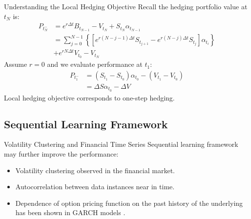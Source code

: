 \documentclass[10pt,table,mathserif]{beamer}
\begin{document}
\begin{frame}{Understanding the Local Hedging Objective}
Recall the hedging portfolio value at $t_N$ is:
\[ \begin{split}
P_{t_N^-}&=e^{r \Delta t} B_{t_{N-1}}- V_{t_N}+ S_{t_N} \alpha_{t_{N-1}}  \\
&=\sum_{j=0}^{N-1}\left\{ \left[e^{r (N-j-1) \Delta t} S_{t_{j+1}}-e^{r (N-j) \Delta t}S_{t_{j}}\right] \alpha_{t_i} \right\}\\
&+e^{r N \Delta t} V_{t_0}-V_{t_N}
\end{split}
\]
Assume $r=0$ and we evaluate performance at $t_1$:
\[ 
\begin{split}
P_{t_1^-}&= (S_{t_{1}}-S_{t_{0}})\alpha_{t_0} -(V_{t_1}-V_{t_0}) \\
		 &= \Delta S \alpha_{t_0} - \Delta V
\end{split}
\]
Local hedging objective corresponds to one-step hedging.
\end{frame}

\subsection{Sequential Learning Framework}
\begin{frame}{Volatility Clustering and Financial Time Series}
Sequential learning framework may further improve the performance:
\begin{itemize}
  \item Volatility clustering observed in the financial market.
  \item Autocorrelation between data instances near in time.
  \item Dependence of option pricing function on the past history of the underlying has been shown in GARCH models \footnotemark.
\end{itemize}
\end{frame}
\end{document}
